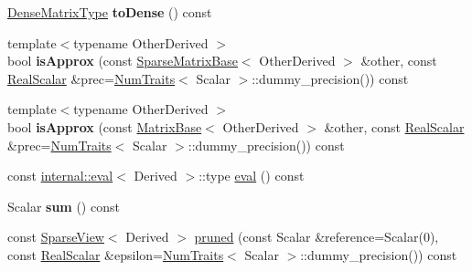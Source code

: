 \begin{DoxyCompactItemize}
\item 
\mbox{\label{class_eigen_1_1_sparse_matrix_base_a6915317b95925fdeec3c8bb1e7eccffd}} 
\mbox{\hyperlink{class_eigen_1_1_sparse_matrix_base_acca1ed7c478dbd2b36b7ef14cb781cff}{Dense\+Matrix\+Type}} {\bfseries to\+Dense} () const
\item 
\mbox{\label{class_eigen_1_1_sparse_matrix_base_a70851868f2d1dbf53bcf1fa1e5c1c970}} 
{\footnotesize template$<$typename Other\+Derived $>$ }\\bool {\bfseries is\+Approx} (const \mbox{\hyperlink{class_eigen_1_1_sparse_matrix_base}{Sparse\+Matrix\+Base}}$<$ Other\+Derived $>$ \&other, const \mbox{\hyperlink{class_eigen_1_1_sparse_matrix_base_aaec8ace6efb785c81d442931c3248d88}{Real\+Scalar}} \&prec=\mbox{\hyperlink{struct_eigen_1_1_num_traits}{Num\+Traits}}$<$ Scalar $>$\+::dummy\+\_\+precision()) const
\item 
\mbox{\label{class_eigen_1_1_sparse_matrix_base_aa881aa7b6759bdec2ccfa45746b24bc2}} 
{\footnotesize template$<$typename Other\+Derived $>$ }\\bool {\bfseries is\+Approx} (const \mbox{\hyperlink{class_eigen_1_1_matrix_base}{Matrix\+Base}}$<$ Other\+Derived $>$ \&other, const \mbox{\hyperlink{class_eigen_1_1_sparse_matrix_base_aaec8ace6efb785c81d442931c3248d88}{Real\+Scalar}} \&prec=\mbox{\hyperlink{struct_eigen_1_1_num_traits}{Num\+Traits}}$<$ Scalar $>$\+::dummy\+\_\+precision()) const
\item 
const \mbox{\hyperlink{struct_eigen_1_1internal_1_1eval}{internal\+::eval}}$<$ Derived $>$\+::type \mbox{\hyperlink{class_eigen_1_1_sparse_matrix_base_a761bd872a06b59632fcff7b7807a77ce}{eval}} () const
\item 
\mbox{\label{class_eigen_1_1_sparse_matrix_base_af06b39a5e72293a4c8f8613364a549ec}} 
Scalar {\bfseries sum} () const
\item 
const \mbox{\hyperlink{class_eigen_1_1_sparse_view}{Sparse\+View}}$<$ Derived $>$ \mbox{\hyperlink{class_eigen_1_1_sparse_matrix_base_ac8d0414b56d9d620ce9a698c1b281e5d}{pruned}} (const Scalar \&reference=Scalar(0), const \mbox{\hyperlink{class_eigen_1_1_sparse_matrix_base_aaec8ace6efb785c81d442931c3248d88}{Real\+Scalar}} \&epsilon=\mbox{\hyperlink{struct_eigen_1_1_num_traits}{Num\+Traits}}$<$ Scalar $>$\+::dummy\+\_\+precision()) const

\end{DoxyCompactItemize}
